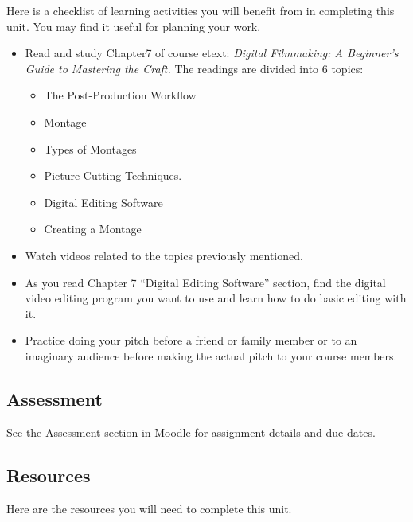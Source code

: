 \documentclass[
]{book}
\providecommand{\tightlist}{%
  \setlength{\itemsep}{0pt}\setlength{\parskip}{0pt}}
\begin{document}
\begin{reflect}
Here is a checklist of learning activities you will benefit from in completing this unit. You may find it useful for planning your work.

\begin{itemize}
\item
  Read and study Chapter7 of course etext: \emph{Digital Filmmaking: A Beginner's Guide to Mastering the Craft.} The readings are divided into 6 topics:

  \begin{itemize}
  \tightlist
  \item
    The Post-Production Workflow
  \item
    Montage
  \item
    Types of Montages
  \item
    Picture Cutting Techniques.
  \item
    Digital Editing Software
  \item
    Creating a Montage
  \end{itemize}
\item
  Watch videos related to the topics previously mentioned.
\item
  As you read Chapter 7 ``Digital Editing Software'' section, find the digital video editing program you want to use and learn how to do basic editing with it.
\item
  Practice doing your pitch before a friend or family member or to an imaginary audience before making the actual pitch to your course members.
\end{itemize}
\end{reflect}

\hypertarget{assessment-11}{%
\subsection*{Assessment}\label{assessment-11}}

See the Assessment section in Moodle for assignment details and due dates.

\hypertarget{resources-6}{%
\subsection*{Resources}\label{resources-6}}

Here are the resources you will need to complete this unit.
\end{document}
